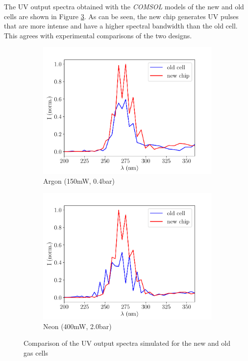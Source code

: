 \documentclass[a4paper]{jpconf}
\begin{document}
The UV output spectra obtained with the \textit{COMSOL} models of the new and old cells are shown in Figure \ref{im:coms}. As can be seen, the new chip generates UV pulses that are more intense and have a higher spectral bandwidth than the old cell. This agrees with experimental comparisons of the two designs. \par 
\begin{figure}[h]
\centering
 \begin{subfigure}{0.5\textwidth}
\includegraphics[width=\textwidth]{im/Ar_old_v_new}
\caption{Argon (150mW, 0.4bar)}\label{im:coms_Ar}
\end{subfigure}
 \begin{subfigure}{0.5\textwidth}
\includegraphics[width=\textwidth]{im/Ne_old_v_new}
\caption{Neon (400mW, 2.0bar)}\label{im:coms_Ne}
\end{subfigure}
\caption{Comparison of the UV output spectra simulated for the new and old gas cells}\label{im:coms}
\end{figure}
\end{document}
